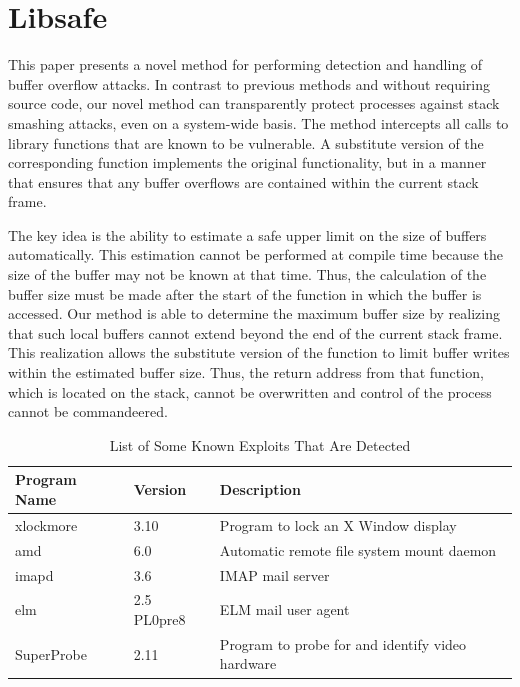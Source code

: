 \documentclass[]{article}
\begin{document}

\section{Libsafe}
\label{sec:overview}

This paper presents a novel method for performing detection and handling of
buffer overflow attacks.  In contrast to previous methods and without requiring
source code, our novel method can transparently protect processes against stack
smashing attacks, even on a system-wide basis.  The method intercepts all calls
to library functions that are known to be vulnerable.  A substitute version of
the corresponding function implements the original functionality, but in a
manner that ensures that any buffer overflows are contained within the current
stack frame.

The key idea is the ability to estimate a safe upper limit on the size of
buffers automatically.  This estimation cannot be performed at compile time
because the size of the buffer may not be known at that time.  Thus, the
calculation of the buffer size must be made after the start of the function in
which the buffer is accessed.  Our method is able to determine the maximum
buffer size by realizing that such local buffers cannot extend beyond the end
of the current stack frame.  This realization allows the substitute version of
the function to limit buffer writes within the estimated buffer size.  Thus,
the return address from that function, which is located on the stack, cannot be
overwritten and control of the process cannot be commandeered.

\begin{table}[thbp]
\caption{List of Some Known Exploits That Are Detected}
\label{tab:detected_exploits}
\begin{center}
\begin{tabular}{|l|l|l|} \hline
Program Name	& Version	& Description \\ \hline\hline
xlockmore	& 3.10		& Program to lock an X Window display \\ \hline
amd		& 6.0		& Automatic remote file system mount daemon \\
\hline
imapd		& 3.6		& IMAP mail server \\ \hline
elm		& 2.5 PL0pre8	& ELM mail user agent \\ \hline
SuperProbe	& 2.11		& Program to probe for and identify video
hardware \\ \hline
\end{tabular}
\end{center}
\end{table}
\end{document}
